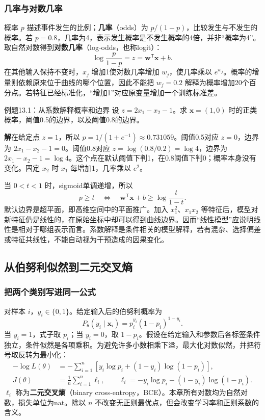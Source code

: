 \documentclass[UTF8,fontset=none,zihao=-4,a4paper]{ctexart}
\newcommand{\term}[1]{\textbf{#1}}
\newcommand{\sol}{\par\noindent\textbf{解}\quad}
\numberwithin{equation}{section}
\numberwithin{figure}{section}
\begin{document}
\subsubsection{几率与对数几率}
概率 $p$ 描述事件发生的比例；\term{几率}（odds）为 $p/(1-p)$，比较发生与不发生的概率。若 $p=0.8$，几率为4，表示发生概率是不发生概率的4倍，并非“概率为4”。取自然对数得到\term{对数几率}（log-odds，也称logit）：
\begin{equation}
 \log\frac{p}{1-p}=z=\symbf{w}^{\mathsf T}\symbf{x}+b.
\end{equation}
在其他输入保持不变时，$x_j$ 增加1使对数几率增加 $w_j$，使几率乘以 $e^{w_j}$。概率的增量则依赖原来位于曲线的哪个位置，因此不能把 $w_j=0.2$ 解释为概率增加20个百分点。若特征已经标准化，“增加1”对应原变量增加一个训练标准差。

\begin{infobox}[unbreakable]{例题13.1：从系数解释概率和边界}
设 $z=2x_1-x_2-1$。求 $\symbf{x}=(1,0)$ 时的正类概率，阈值0.5的边界，以及阈值0.8的边界。
\sol 在给定点 $z=1$，所以 $p=1/(1+e^{-1})\approx0.731059$。阈值0.5对应 $z=0$，边界为 $2x_1-x_2-1=0$。阈值0.8对应 $z=\log(0.8/0.2)=\log4$，边界为 $2x_1-x_2-1=\log4$。这个点在默认阈值下判1，在0.8阈值下判0；概率本身没有变化。固定 $x_2$ 时 $x_1$ 每增加1，几率乘以 $e^2$。
\end{infobox}
当 $0<t<1$ 时，sigmoid单调递增，所以
\[
 p\ge t\quad\Longleftrightarrow\quad
 \symbf{w}^{\mathsf T}\symbf{x}+b\ge\log\frac{t}{1-t}.
\]
默认边界是超平面，即高维空间中的平面推广。加入 $x_1^2$、$x_1x_2$ 等特征后，模型对新特征仍是线性的，在原始坐标中却可以得到曲线边界。因而“线性模型”应说明线性是相对于哪组表示而言。系数解释是条件相关的模型解释，若有混杂、选择偏差或特征共线性，不能自动视为干预造成的因果变化。

\subsection{从伯努利似然到二元交叉熵}
\subsubsection{把两个类别写进同一公式}
对样本 $i$，$y_i\in\{0,1\}$。给定输入后的伯努利概率为
\[
 P_\theta(y_i\mid\symbf{x}_i)=p_i^{y_i}(1-p_i)^{1-y_i}.
\]
当 $y_i=1$，式子取 $p_i$；当 $y_i=0$，取 $1-p_i$。假设在给定输入和参数后各标签条件独立，条件似然是各项乘积。为避免许多小数相乘下溢，最大化对数似然，并把符号取反转为最小化：
\begin{align}
 -\log L(\theta)&=-\sum_{i=1}^n[y_i\log p_i+(1-y_i)\log(1-p_i)],\\
 J(\theta)&=\frac1n\sum_{i=1}^n\ell_i,\qquad
 \ell_i=-y_i\log p_i-(1-y_i)\log(1-p_i).
\end{align}
$\ell_i$ 称为\term{二元交叉熵}（binary cross-entropy，BCE）。本章所有对数均为自然对数，损失单位为nat。除以 $n$ 不改变无正则最优点，但会改变学习率和正则系数的含义。
\end{document}
